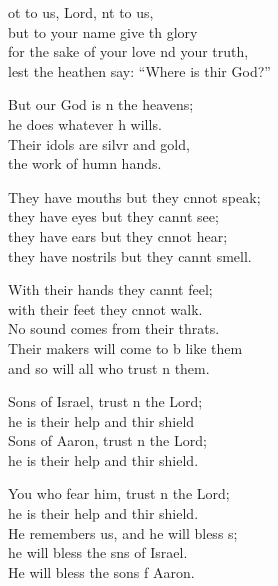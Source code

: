 \settowidth{\versewidth}{for the sake of your love and your truth, *}
\begin{psalmverse}%
  \begin{patverse}
ot to us, Lord, nt to us,\Med\\
but to your name give th glory\\
for the sake of your love nd your truth,\Med\\
lest the heathen say: “Where is thir God?”

But our God is \pointup{\i}n the heavens;\Med\\
he does whatever h wills.\\
Their idols are silvr and gold,\Med\\
the work of humn hands.

They have mouths but they cnnot speak;\Med\\
they have eyes but they cannt see;\\
they have ears but they cnnot hear;\Med\\
they have nostrils but they cannt smell.

With their hands they cannt feel;\Flex\\
with their feet they cnnot walk.\Med\\
No sound comes from their thrats.\\
Their makers will come to b like them\Med\\
and so will all who trust \pointup{\i}n them.

Sons of Israel, trust \pointup{\i}n the Lord;\Med\\
he is their help and thir shield\\
Sons of Aaron, trust \pointup{\i}n the Lord;\Med\\
he is their help and thir shield.

You who fear him, trust \pointup{\i}n the Lord;\Med\\
he is their help and thir shield.\\
He remembers us, and he will bless s;\Flex\\
he will bless the sns of Israel.\Med\\
He will bless the sons f Aaron.


\end{patverse}
\end{psalmverse}
